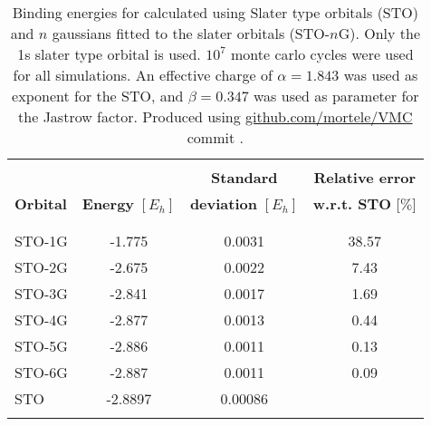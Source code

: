 \documentclass[../../master.tex]{subfiles}
\begin{document}
\begin{table}[p]
\centering{}
\setlength\extrarowheight{2pt}
\begin{tabularx}{\textwidth}{X *{3}{S[table-format=-1.3,table-space-text-post=***]}}
\hline
\hline
\\[-0.9em]
                 &                          & \phantom{-}\textbf{Standard}          & \textbf{Relative error}    \\
\textbf{Orbital} & \textbf{Energy} $[E_h]$  & \textbf{deviation} $[E_h]$ & \textbf{w.r.t. STO} [$\%$]  \\
\\[-0.9em]
\hline
\\[-0.9em]
STO-1G & -1.775  & 0.0031  &  38.57 \\
STO-2G & -2.675  & 0.0022  &   7.43 \\
STO-3G & -2.841  & 0.0017  &   1.69 \\
STO-4G & -2.877  & 0.0013  &   0.44 \\
STO-5G & -2.886  & 0.0011  &   0.13 \\
STO-6G & -2.887  & 0.0011  &   0.09 \\
STO    & -2.8897 & 0.00086 & \\
\\[-0.9em]
\hline
\end{tabularx}
\caption{Binding energies for  calculated using Slater type orbitals (STO) and $n$ gaussians fitted to the slater orbitals (STO-$n$G). Only the 1s slater type orbital is used. $10^7$ monte carlo cycles were used for all simulations. An effective charge of $\alpha=1.843$ was used as exponent for the STO, and $\beta=0.347$ was used as parameter for the Jastrow factor. Produced using \url{github.com/mortele/VMC} commit . \label{tab:vmcv1}}
\end{table}
\end{document}
